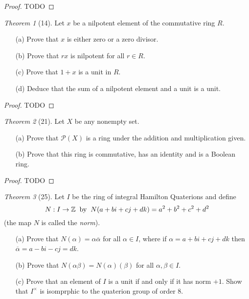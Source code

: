 \documentclass[12pt]{article}
\theoremstyle{remark}
\theoremstyle{named}
\newtheorem*{theorem}{Theorem}
\renewcommand{\a}{\alpha}
\renewcommand{\b}{\beta}
\newcommand{\Z}{\mathbb Z}
\begin{document}
\begin{proof}
    TODO
\end{proof}

\begin{theorem}[14]
    Let \(x\) be a nilpotent element of the commutative ring \(R\).
    \begin{enumerate}
        \item[(a)] Prove that \(x\) is either zero or a zero divisor.
        \item[(b)] Prove that \(rx\) is nilpotent for all \(r \in R\).
        \item[(c)] Prove that \(1 + x\) is a unit in \(R\). 
        \item[(d)] Deduce that the sum of a nilpotent element and a unit is a unit.
    \end{enumerate}
\end{theorem}

\begin{proof}
    TODO
\end{proof}

\begin{theorem}[21]
    Let \(X\) be any nonempty set.
    \begin{enumerate}
        \item[(a)] Prove that \(\mathcal P (X)\) is a ring under the addition and multiplication given.
        \item[(b)] Prove that this ring is commutative, has an identity and is a Boolean ring.
    \end{enumerate}
\end{theorem}

\begin{proof}
    TODO
\end{proof}

\begin{theorem}[25]
    Let \(I\) be the ring of integral Hamilton Quaterions and define 
    \[N : I \to \Z \hspace{2mm} \text{by} \hspace{2mm} N(a + bi + cj + dk) = a^2 + b^2 + c^2 + d^2\]
    (the map \(N\) is called the \textit{norm}).
    \begin{enumerate}
        \item[(a)] Prove that \(N(\alpha) = \alpha\overline{\alpha}\) for all \(\alpha \in I\), where if \(\alpha = a + bi + cj + dk\) then \(\overline{\alpha} = a - bi - cj = dk\).
        \item[(b)] Prove that \(N(\alpha\beta) = N(\alpha)(\beta)\) for all \(\a, \b \in I\).
        \item[(c)] Prove that an element of \(I\) is a unit if and only if it has norm \(+1\). Show that \(I^\times\) is isomprphic to the quaterion group of order 8.
    \end{enumerate}
\end{theorem}
\end{document}
